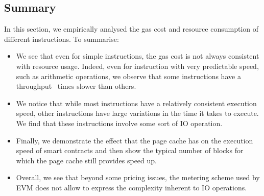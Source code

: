 \subsection{Summary}
In this section, we empirically analysed the gas cost and resource consumption of different instructions. To summarise:
\begin{itemize}
	\item We see that even for simple instructions, the gas cost is not always consistent with resource usage. Indeed, even for instruction with very predictable speed, such as arithmetic operations, we observe that some instructions have a throughput~ times slower than others.
	\item We notice that while most instructions have a relatively consistent execution speed, other instructions have large variations in the time it takes to execute. We find that these instructions involve some sort of IO operation.
	\item Finally, we demonstrate the effect that the page cache has on the execution speed of smart contracts and then show the typical number of blocks for which the page cache still provides speed up.
	\item Overall, we see that beyond some pricing issues, the metering scheme used by EVM does not allow to express the complexity inherent to IO operations.
\end{itemize}
